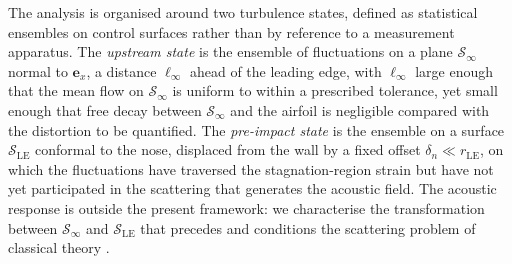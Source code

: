 \documentclass[lineno]{JFM-FLM_Au}
\begin{document}
The analysis is organised around two turbulence states, defined as
statistical ensembles on control surfaces rather than by reference to a
measurement apparatus. The \emph{upstream state} is the ensemble of
fluctuations on a plane $\mathcal{S}_\infty$ normal to
$\boldsymbol{e}_x$, a distance $\ell_\infty$ ahead of the leading edge,
with $\ell_\infty$ large enough that the mean flow on $\mathcal{S}_\infty$
is uniform to within a prescribed tolerance, yet small enough that free
decay between $\mathcal{S}_\infty$ and the airfoil is negligible compared
with the distortion to be quantified. The \emph{pre-impact state} is the
ensemble on a surface $\mathcal{S}_{\mathrm{LE}}$ conformal to the nose,
displaced from the wall by a fixed offset $\delta_n \ll r_{\mathrm{LE}}$,
on which the fluctuations have traversed the stagnation-region strain but
have not yet participated in the scattering that generates the acoustic
field. The acoustic response is outside the present framework: we
characterise the transformation between $\mathcal{S}_\infty$ and
$\mathcal{S}_{\mathrm{LE}}$ that precedes and conditions the scattering
problem of classical theory \citep{Amiet1975,Goldstein1976}.
\end{document}
